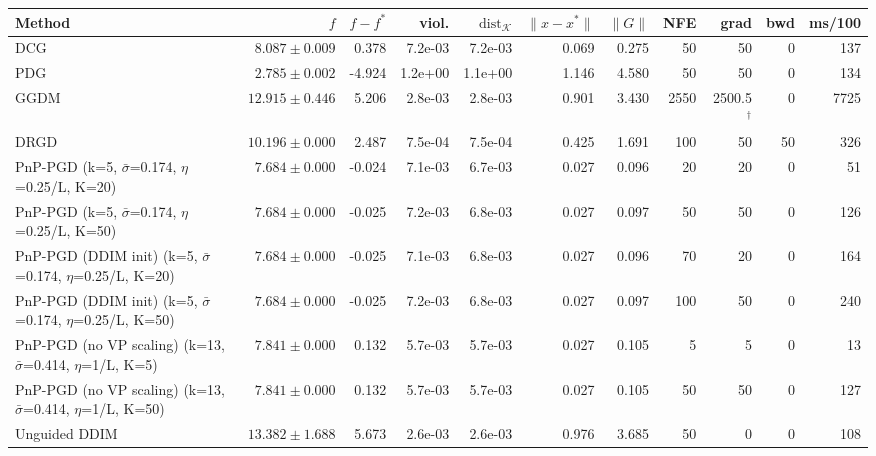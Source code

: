 \begin{tabular}{lrrrrrrrrrr}
\toprule
Method & $f$ & $f-f^*$ & viol. & $\mathrm{dist}_\mathcal{K}$ & $\|x-x^*\|$ & $\|G\|$ & NFE & grad & bwd & ms/100 \\
\midrule
DCG & $8.087\pm0.009$ & 0.378 & 7.2e-03 & 7.2e-03 & 0.069 & 0.275 & 50 & 50 & 0 & 137 \\
PDG & $2.785\pm0.002$ & -4.924 & 1.2e+00 & 1.1e+00 & 1.146 & 4.580 & 50 & 50 & 0 & 134 \\
GGDM & $12.915\pm0.446$ & 5.206 & 2.8e-03 & 2.8e-03 & 0.901 & 3.430 & 2550 & 2500.5$^\dagger$ & 0 & 7725 \\
DRGD & $10.196\pm0.000$ & 2.487 & 7.5e-04 & 7.5e-04 & 0.425 & 1.691 & 100 & 50 & 50 & 326 \\
PnP-PGD (k=5, $\bar\sigma$=0.174, $\eta$=0.25/L, K=20) & $7.684\pm0.000$ & -0.024 & 7.1e-03 & 6.7e-03 & 0.027 & 0.096 & 20 & 20 & 0 & 51 \\
PnP-PGD (k=5, $\bar\sigma$=0.174, $\eta$=0.25/L, K=50) & $7.684\pm0.000$ & -0.025 & 7.2e-03 & 6.8e-03 & 0.027 & 0.097 & 50 & 50 & 0 & 126 \\
PnP-PGD (DDIM init) (k=5, $\bar\sigma$=0.174, $\eta$=0.25/L, K=20) & $7.684\pm0.000$ & -0.025 & 7.1e-03 & 6.8e-03 & 0.027 & 0.096 & 70 & 20 & 0 & 164 \\
PnP-PGD (DDIM init) (k=5, $\bar\sigma$=0.174, $\eta$=0.25/L, K=50) & $7.684\pm0.000$ & -0.025 & 7.2e-03 & 6.8e-03 & 0.027 & 0.097 & 100 & 50 & 0 & 240 \\
PnP-PGD (no VP scaling) (k=13, $\bar\sigma$=0.414, $\eta$=1/L, K=5) & $7.841\pm0.000$ & 0.132 & 5.7e-03 & 5.7e-03 & 0.027 & 0.105 & 5 & 5 & 0 & 13 \\
PnP-PGD (no VP scaling) (k=13, $\bar\sigma$=0.414, $\eta$=1/L, K=50) & $7.841\pm0.000$ & 0.132 & 5.7e-03 & 5.7e-03 & 0.027 & 0.105 & 50 & 50 & 0 & 127 \\
Unguided DDIM & $13.382\pm1.688$ & 5.673 & 2.6e-03 & 2.6e-03 & 0.976 & 3.685 & 50 & 0 & 0 & 108 \\
\bottomrule
\end{tabular}
\par{}

